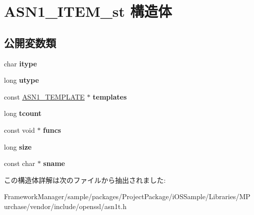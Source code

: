 \hypertarget{struct_a_s_n1___i_t_e_m__st}{}\section{A\+S\+N1\+\_\+\+I\+T\+E\+M\+\_\+st 構造体}
\label{struct_a_s_n1___i_t_e_m__st}
\subsection*{公開変数類}
\begin{DoxyCompactItemize}
\item 
\hypertarget{struct_a_s_n1___i_t_e_m__st_a303cc31bacb86b92451cb5b389e57440}{}char {\bfseries itype}\label{struct_a_s_n1___i_t_e_m__st_a303cc31bacb86b92451cb5b389e57440}

\item 
\hypertarget{struct_a_s_n1___i_t_e_m__st_a49602e67011b80d23622751f6ce154f5}{}long {\bfseries utype}\label{struct_a_s_n1___i_t_e_m__st_a49602e67011b80d23622751f6ce154f5}

\item 
\hypertarget{struct_a_s_n1___i_t_e_m__st_a63735dc5d18e7f66b3071f4ca76e8462}{}const \hyperlink{struct_a_s_n1___t_e_m_p_l_a_t_e__st}{A\+S\+N1\+\_\+\+T\+E\+M\+P\+L\+A\+T\+E} $\ast$ {\bfseries templates}\label{struct_a_s_n1___i_t_e_m__st_a63735dc5d18e7f66b3071f4ca76e8462}

\item 
\hypertarget{struct_a_s_n1___i_t_e_m__st_a52bce8167464f68b77aeeabf7b8c26d9}{}long {\bfseries tcount}\label{struct_a_s_n1___i_t_e_m__st_a52bce8167464f68b77aeeabf7b8c26d9}

\item 
\hypertarget{struct_a_s_n1___i_t_e_m__st_abb4e623222d55a9c7b203c9b29e5aefe}{}const void $\ast$ {\bfseries funcs}\label{struct_a_s_n1___i_t_e_m__st_abb4e623222d55a9c7b203c9b29e5aefe}

\item 
\hypertarget{struct_a_s_n1___i_t_e_m__st_a5f11bb1968cd49b114d1459ecb9574d9}{}long {\bfseries size}\label{struct_a_s_n1___i_t_e_m__st_a5f11bb1968cd49b114d1459ecb9574d9}

\item 
\hypertarget{struct_a_s_n1___i_t_e_m__st_a2375aeececad55dcefd782c78a661fe6}{}const char $\ast$ {\bfseries sname}\label{struct_a_s_n1___i_t_e_m__st_a2375aeececad55dcefd782c78a661fe6}

\end{DoxyCompactItemize}


この構造体詳解は次のファイルから抽出されました\+:\begin{DoxyCompactItemize}
\item 
Framework\+Manager/sample/packages/\+Project\+Package/i\+O\+S\+Sample/\+Libraries/\+M\+Purchase/vendor/include/openssl/asn1t.\+h\end{DoxyCompactItemize}
